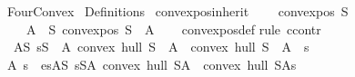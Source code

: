 %
\begin{isabellebody}%
%
%
\isadelimtheory
%
\endisadelimtheory
%
\isatagtheory
{}\isamarkupfalse%
\ Four{\isacharunderscore}{\kern0pt}Convex\isanewline
{}\ Definitions\isanewline
{}%
\endisatagtheory
{\isafoldtheory}%
%
\isadelimtheory
\isanewline
%
\endisadelimtheory
\isanewline
{}\isamarkupfalse%
\ convex{\isacharunderscore}{\kern0pt}pos{\isacharunderscore}{\kern0pt}inherit{\isacharprime}{\kern0pt}{\isacharcolon}{\kern0pt}\ \isanewline
\ \ \ {\isachardoublequoteopen}convex{\isacharunderscore}{\kern0pt}pos\ S{\isachardoublequoteclose}\isanewline
\ \ \ {\isachardoublequoteopen}{\isasymforall}\ A\ {\isasymsubseteq}\ S{\isachardot}{\kern0pt}\ convex{\isacharunderscore}{\kern0pt}pos\ {\isacharparenleft}{\kern0pt}S\ {\isacharminus}{\kern0pt}\ A{\isacharparenright}{\kern0pt}{\isachardoublequoteclose}\isanewline
%
\isadelimproof
\ \ %
\endisadelimproof
%
\isatagproof
{}\isamarkupfalse%
\ convex{\isacharunderscore}{\kern0pt}pos{\isacharunderscore}{\kern0pt}def\isanewline
{}\isamarkupfalse%
{\isacharparenleft}{\kern0pt}rule\ ccontr{\isacharparenright}{\kern0pt}\isanewline
\ \ \isamarkupfalse%
\ {\isachardoublequoteopen}{\isasymnot}\ {\isacharparenleft}{\kern0pt}{\isasymforall}A{\isasymsubseteq}S{\isachardot}{\kern0pt}\ {\isasymforall}s{\isasymin}S\ {\isacharminus}{\kern0pt}\ A{\isachardot}{\kern0pt}\ convex\ hull\ {\isacharparenleft}{\kern0pt}S\ {\isacharminus}{\kern0pt}\ A{\isacharparenright}{\kern0pt}\ {\isasymnoteq}\ convex\ hull\ {\isacharparenleft}{\kern0pt}S\ {\isacharminus}{\kern0pt}\ A\ {\isacharminus}{\kern0pt}\ {\isacharbraceleft}{\kern0pt}s{\isacharbraceright}{\kern0pt}{\isacharparenright}{\kern0pt}{\isacharparenright}{\kern0pt}{\isachardoublequoteclose}\isanewline
\ \ \isamarkupfalse%
\ \isamarkupfalse%
\ A\ s\ \ es{\isacharcolon}{\kern0pt}{\isachardoublequoteopen}A{\isasymsubseteq}S{\isachardoublequoteclose}\ {\isachardoublequoteopen}s{\isasymin}S{\isacharminus}{\kern0pt}A{\isachardoublequoteclose}\ {\isachardoublequoteopen}convex\ hull\ {\isacharparenleft}{\kern0pt}S{\isacharminus}{\kern0pt}A{\isacharparenright}{\kern0pt}\ {\isacharequal}{\kern0pt}\ convex\ hull\ {\isacharparenleft}{\kern0pt}S{\isacharminus}{\kern0pt}A{\isacharminus}{\kern0pt}{\isacharbraceleft}{\kern0pt}s{\isacharbraceright}{\kern0pt}{\isacharparenright}{\kern0pt}{\isachardoublequoteclose}\ \isanewline

\end{isabellebody}
